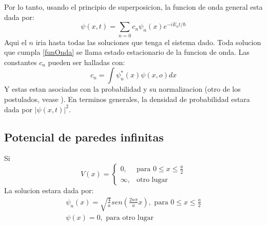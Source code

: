 \documentclass[a4paper, twocolumn, 10pt]{article}
\begin{document}
    Por lo tanto, usando el principio de superposicion, la funcion de onda general esta dada por:
    \begin{equation}
        \psi(x,t) = \sum_{n=0} c_{n}\psi_{n}(x)e^{-iE_{n}t/\hbar}
        \label{funOnda}
    \end{equation}
    Aqui el $n$ iria hasta todas las soluciones que tenga el sistema dado. Toda solucion que cumpla \ref{funOnda} se llama estado estacionario de la funcion de onda. Las constantes $c_{n}$ pueden ser halladas con:
    \begin{equation}
        c_{n} = \int \psi^{*}_{n}(x) \psi(x,o) dx
        \label{cn}
    \end{equation}
    Y estas estan asociadas con la probabilidad y su normalizacion (otro de los postulados, vease \cite{quantum-cohen}). En terminos generales, la densidad de probabilidad estara dada por $|\psi(x,t)|^{2}$.

\subsection{Potencial de paredes infinitas}
    Si 
    \begin{equation}
        V(x) = 
        \left \{
        \begin{array}{ll}
            0, & \textrm{para  } 0 \leq x \leq \frac{a}{2} \\
            \infty, & \textrm{otro lugar} 
        \end{array}
        \right.
    \end{equation}
La solucion estara dada por:
\begin{eqnarray}
    \psi_{n}(x) = \sqrt{\frac{4}{a}} sen(\frac{2n\pi}{a}x), \textrm{ para  } 0 \leq x \leq \frac{a}{2} \\
    \psi(x) = 0, \textrm{ para otro lugar} 
\end{eqnarray}
\end{document}
